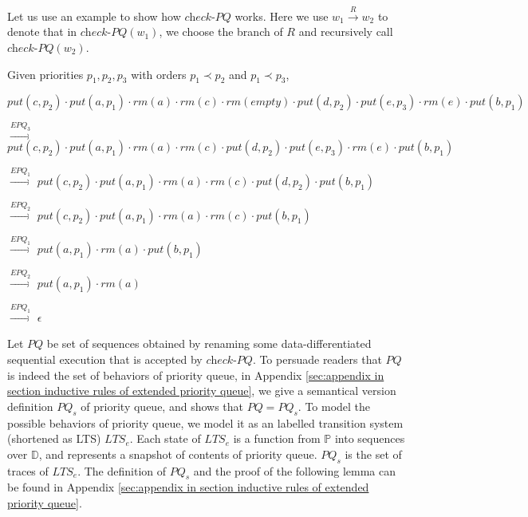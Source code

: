 Let us use an example to show how $\textit{check-PQ}$ works. Here we use $w_1 \xrightarrow{R} w_2$ to denote that in $\textit{check-PQ}(w_1)$, we choose the branch of $R$ and recursively call $\textit{check-PQ}(w_2)$.

\begin{example}\label{example:generate extended priority queue executions}
Given priorities $p_1,p_2,p_3$ with orders $p_1 \prec p_2$ and $p_1 \prec p_3$,

\noindent $\textit{put}(c,p_2) \cdot \textit{put}(a,p_1) \cdot \textit{rm}(a) \cdot \textit{rm}(c) \cdot \textit{rm}(\textit{empty}) \cdot \textit{put}(d,p_2) \cdot \textit{put}(e,p_3) \cdot \textit{rm}(e) \cdot \textit{put}(b,p_1)$

$\xrightarrow{\textit{EPQ}_3}$ $\textit{put}(c,p_2) \cdot \textit{put}(a,p_1) \cdot \textit{rm}(a) \cdot \textit{rm}(c) \cdot \textit{put}(d,p_2) \cdot \textit{put}(e,p_3) \cdot \textit{rm}(e) \cdot \textit{put}(b,p_1)$

$\xrightarrow{\textit{EPQ}_1}$ $\textit{put}(c,p_2) \cdot \textit{put}(a,p_1) \cdot \textit{rm}(a) \cdot \textit{rm}(c) \cdot \textit{put}(d,p_2) \cdot \textit{put}(b,p_1)$

$\xrightarrow{\textit{EPQ}_2}$ $\textit{put}(c,p_2) \cdot \textit{put}(a,p_1) \cdot \textit{rm}(a) \cdot \textit{rm}(c) \cdot \textit{put}(b,p_1)$

$\xrightarrow{\textit{EPQ}_1}$ $\textit{put}(a,p_1) \cdot \textit{rm}(a) \cdot \textit{put}(b,p_1)$

$\xrightarrow{\textit{EPQ}_2}$ $\textit{put}(a,p_1) \cdot \textit{rm}(a)$

$\xrightarrow{\textit{EPQ}_1}$ $\epsilon$
\end{example}


Let $\textit{PQ}$ be set of sequences obtained by renaming some data-differentiated sequential execution that is accepted by $\textit{check-PQ}$. To persuade readers that $\textit{PQ}$ is indeed the set of behaviors of priority queue, in Appendix \ref{sec:appendix in section inductive rules of extended priority queue}, we give a semantical version definition $\textit{PQ}_s$ of priority queue, and shows that $\textit{PQ} = \textit{PQ}_s$. To model the possible behaviors of priority queue, we model it as an labelled transition system (shortened as LTS) $\textit{LTS}_e$. Each state of $\textit{LTS}_e$ is a function from $\mathbb{P}$ into sequences over $\mathbb{D}$, and represents a snapshot of contents of priority queue. $\textit{PQ}_s$ is the set of traces of $\textit{LTS}_e$. The definition of $\textit{PQ}_s$ and the proof of the following lemma can be found in Appendix \ref{sec:appendix in section inductive rules of extended priority queue}.

